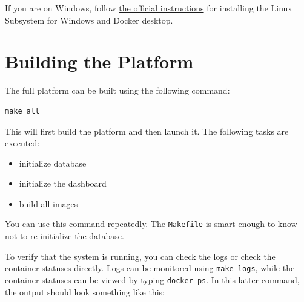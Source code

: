 \documentclass[
]{book}
\providecommand{\tightlist}{%
  \setlength{\itemsep}{0pt}\setlength{\parskip}{0pt}}
\begin{document}
If you are on Windows, follow
\href{https://learn.microsoft.com/en-us/windows/wsl/tutorials/wsl-containers}{the official instructions}
for installing the Linux Subsystem for Windows and Docker desktop.

\hypertarget{building-the-platform}{%
\section{Building the Platform}\label{building-the-platform}}

The full platform can be built using the following command:

\begin{verbatim}
make all
\end{verbatim}

This will first build the platform and then launch it. The following tasks
are executed:

\begin{itemize}
\tightlist
\item
  initialize database
\item
  initialize the dashboard
\item
  build all images
\end{itemize}

You can use this command repeatedly. The \texttt{Makefile} is smart enough to know
not to re-initialize the database.

To verify that the system is running, you can check the logs or check
the container statuses directly. Logs can be monitored using \texttt{make\ logs},
while the container statuses can be viewed by typing \texttt{docker\ ps}.
In this latter command, the output should look something like this:
\end{document}
